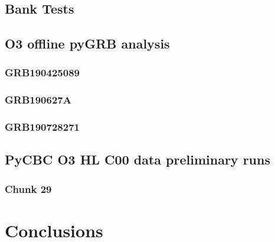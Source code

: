 \documentclass[binding=0.6cm, LaM]{sapthesis}
\begin{document}
\section{Bank Tests}

\section{O3 offline pyGRB analysis}

\subsection{GRB190425089}

\subsection{GRB190627A}

\subsection{GRB190728271}

\section{PyCBC O3 HL C00 data preliminary runs}

\subsection{Chunk 29}

\chapter{Conclusions}

\backmatter
\cleardoublepage

\end{document}
